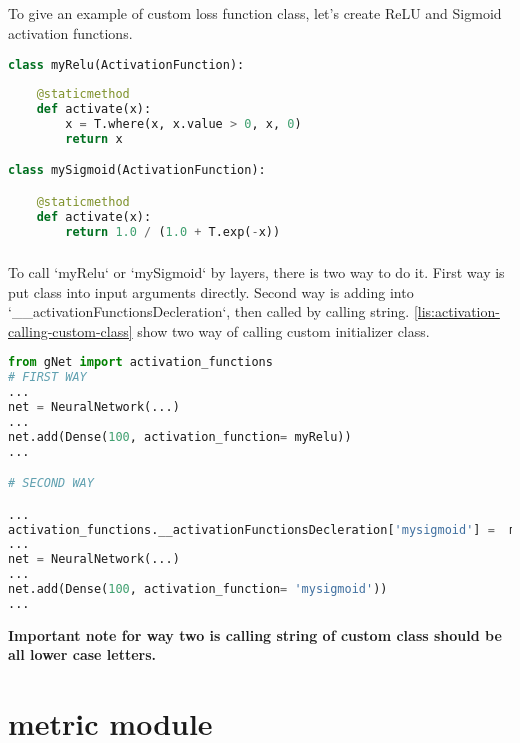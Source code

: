 \documentclass[12pt]{report}
\begin{document}
\paragraph{}
To give an example of custom loss function class, let's create ReLU and Sigmoid activation functions.


\begin{lstlisting}[language=Python, numbers=none, caption={Custom activation function classes.}, label={lis:activation-function-custom-class}]
class myRelu(ActivationFunction):
  
	@staticmethod
	def activate(x):  
		x = T.where(x, x.value > 0, x, 0)
		return x

class mySigmoid(ActivationFunction):

	@staticmethod
	def activate(x):
		return 1.0 / (1.0 + T.exp(-x))

\end{lstlisting}

\paragraph{}
To call `myRelu` or `mySigmoid` by layers, there is two way to do it. First way is put class into input arguments directly. Second way is adding into  `\_\_activationFunctionsDecleration`, then called by calling string. \ref{lis:activation-calling-custom-class} show two way of calling custom initializer class.

\begin{lstlisting}[language=Python, numbers=none,  caption={Calling custom activation function class.}, label={lis:activation-calling-custom-class}]
from gNet import activation_functions
# FIRST WAY
...
net = NeuralNetwork(...)
...
net.add(Dense(100, activation_function= myRelu))
...

# SECOND WAY

...
activation_functions.__activationFunctionsDecleration['mysigmoid'] =  mySigmoid
...
net = NeuralNetwork(...)
...
net.add(Dense(100, activation_function= 'mysigmoid'))
...

\end{lstlisting}

\textbf{Important note for way two is calling string of custom class should be all lower case letters. }





\chapter{metric module}
\label{ch:metric}
\end{document}
